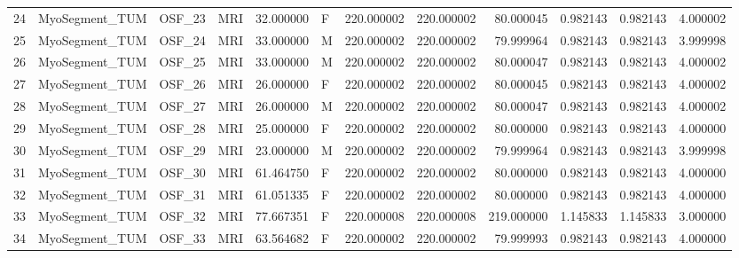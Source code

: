 \begin{tabular}{llllrlrrrrrr}
24     &  MyoSegment\_TUM &       OSF\_23 &                MRI &  32.000000 &        F &       220.000002 &    220.000002 &   80.000045 &               0.982143 &            0.982143 &          4.000002 \\
25     &  MyoSegment\_TUM &       OSF\_24 &                MRI &  33.000000 &        M &       220.000002 &    220.000002 &   79.999964 &               0.982143 &            0.982143 &          3.999998 \\
26     &  MyoSegment\_TUM &       OSF\_25 &                MRI &  33.000000 &        M &       220.000002 &    220.000002 &   80.000047 &               0.982143 &            0.982143 &          4.000002 \\
27     &  MyoSegment\_TUM &       OSF\_26 &                MRI &  26.000000 &        F &       220.000002 &    220.000002 &   80.000045 &               0.982143 &            0.982143 &          4.000002 \\
28     &  MyoSegment\_TUM &       OSF\_27 &                MRI &  26.000000 &        M &       220.000002 &    220.000002 &   80.000047 &               0.982143 &            0.982143 &          4.000002 \\
29     &  MyoSegment\_TUM &       OSF\_28 &                MRI &  25.000000 &        F &       220.000002 &    220.000002 &   80.000000 &               0.982143 &            0.982143 &          4.000000 \\
30     &  MyoSegment\_TUM &       OSF\_29 &                MRI &  23.000000 &        M &       220.000002 &    220.000002 &   79.999964 &               0.982143 &            0.982143 &          3.999998 \\
31     &  MyoSegment\_TUM &       OSF\_30 &                MRI &  61.464750 &        F &       220.000002 &    220.000002 &   80.000000 &               0.982143 &            0.982143 &          4.000000 \\
32     &  MyoSegment\_TUM &       OSF\_31 &                MRI &  61.051335 &        F &       220.000002 &    220.000002 &   80.000000 &               0.982143 &            0.982143 &          4.000000 \\
33     &  MyoSegment\_TUM &       OSF\_32 &                MRI &  77.667351 &        F &       220.000008 &    220.000008 &  219.000000 &               1.145833 &            1.145833 &          3.000000 \\
34     &  MyoSegment\_TUM &       OSF\_33 &                MRI &  63.564682 &        F &       220.000002 &    220.000002 &   79.999993 &               0.982143 &            0.982143 &          4.000000 \\

\end{tabular}
